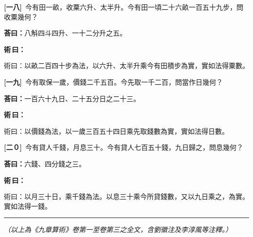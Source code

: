 \documentclass[11pt,a4paper]{article}
\newenvironment{method}{%
  \par\noindent\textcolor{methodcolor}{\textbf{術\,曰：}}%
  \ignorespaces
}{\par\vspace{0.5em}}
\newcommand{\problemnum}[1]{\textbf{[\ignorespaces#1\unskip]}}
\begin{document}
\noindent\problemnum{一八}\,
今有田一畝，收粟六升、太半升。今有田一頃二十六畝一百五十九步，問收粟幾何？

\noindent\textcolor{answercolor}{\textbf{荅曰：}}八斛四斗四升、一十二分升之五。

\begin{method}
術曰：以畝二百四十步為法，以六升、太半升乘今有田積步為實，實如法得粟數。
\end{method}

\noindent\problemnum{一九}\,
今有取保一歲，價錢二千五百。今先取一千二百，問當作日幾何？

\noindent\textcolor{answercolor}{\textbf{荅曰：}}一百六十九日、二十五分日之二十三。

\begin{method}
術曰：以價錢為法，以一歲三百五十四日乘先取錢數為實，實如法得日數。
\end{method}

\noindent\problemnum{二０}\,
今有貸人千錢，月息三十。今有貸人七百五十錢，九日歸之，問息幾何？

\noindent\textcolor{answercolor}{\textbf{荅曰：}}六錢、四分錢之三。

\begin{method}
術曰：以月三十日，乘千錢為法。以息三十乘今所貸錢數，又以九日乘之，為實。實如法得一錢。
\end{method}


\vspace{1em}
\begin{center}
\rule{0.5\textwidth}{0.4pt}
\end{center}

\vspace{1em}

\noindent\textit{（以上為《九章算術》卷第一至卷第三之全文，含劉徽注及李淳風等注釋。）}
\end{document}
